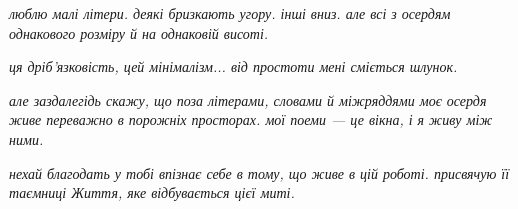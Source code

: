 \emph{люблю малі літери. деякі бризкають угору. інші вниз. але всі з осердям однакового розміру й на однаковій висоті.}

\emph{ця дріб'язковість, цей мінімалізм... від простоти мені сміється шлунок.}

\emph{але заздалегідь скажу, що поза літерами, словами й міжряддями моє осердя живе переважно в порожніх просторах. мої поеми --- це вікна, і я живу між ними.}

\emph{нехай благодать у тобі впізнає себе в тому, що живе в цій роботі. присвячую її таємниці Життя, яке відбувається цієї миті.}

